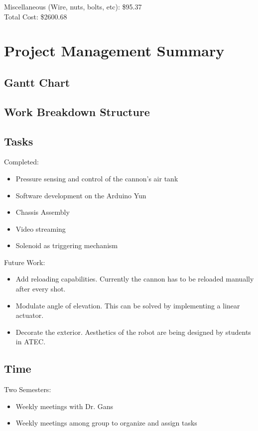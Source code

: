 \documentclass[letterpaper,12pt]{article}
\begin{document}
Miscellaneous (Wire, nuts, bolts, etc): \$95.37 \\

Total Cost: \$2600.68

\pagebreak

\section{Project Management Summary}
\label{sec:projman}

\subsection{Gantt Chart}



\subsection{Work Breakdown Structure}


\subsection{Tasks}
Completed:
\begin{itemize}
\item Pressure sensing and control of the cannon's air tank
\item Software development on the Arduino Yun
\item Chassis Assembly
\item Video streaming
\item Solenoid as triggering mechanism
\end{itemize}

Future Work:
\begin{itemize}
    \item Add reloading capabilities. Currently the cannon has to be reloaded
        manually after every shot.
    \item Modulate angle of elevation. This can be solved by implementing
        a linear actuator.
    \item Decorate the exterior. Aesthetics of the robot are being designed by
        students in ATEC.
\end{itemize}

\subsection{Time}
Two Semesters:
\begin{itemize}
    \item Weekly meetings with Dr. Gans
    \item Weekly meetings among group to organize and assign tasks
\end{itemize}
\end{document}
